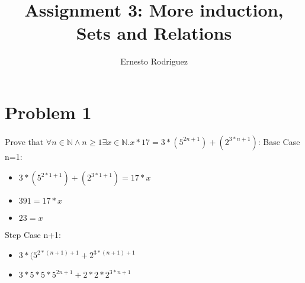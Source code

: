 \documentclass{article}
\title{Assignment 3: More induction, Sets and Relations}
\author{Ernesto Rodriguez}
\begin{document}
\maketitle

\section{Problem 1}

Prove that $\forall n \in \mathbb{N} \wedge n \geq 1 \exists x \in \mathbb{N} . x*17 = 3*(5^{2n+1})+(2^{3*n+1}) $: 
\newline
Base Case n=1:

\begin{itemize}
  
\item {$3*(5^{2*1+1})+(2^{3*1+1})=17*x$}
\item $391=17*x$
\item $23=x$

\end{itemize}

Step Case n+1:

\begin{itemize}

  \item{$3*(5^{2*(n+1)+1} + 2^{3*(n+1)+1}$}
  \item{$3*5*5*5^{2n+1} + 2*2*2^{3*n+1}$}

\end{itemize}
\end{document}
